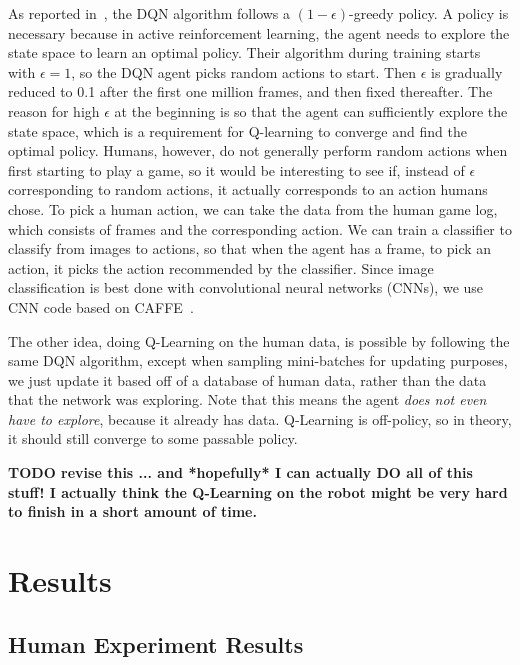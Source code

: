 \documentclass[letterpaper, 10 pt, conference]{ieeeconf}  %
\begin{document}
As reported in~\cite{mnih-dqn-2015}, the DQN algorithm follows a $(1-\epsilon)$-greedy policy. A
policy is necessary because in active reinforcement learning, the agent needs to explore the state
space to learn an optimal policy. Their algorithm during training starts with $\epsilon=1$, so the
DQN agent picks random actions to start. Then $\epsilon$ is gradually reduced to 0.1 after the first
one million frames, and then fixed thereafter. The reason for high $\epsilon$ at the beginning is so
that the agent can sufficiently explore the state space, which is a requirement for Q-learning to
converge and find the optimal policy. Humans, however, do not generally perform random actions when
first starting to play a game, so it would be interesting to see if, instead of $\epsilon$
corresponding to random actions, it actually corresponds to an action humans chose. To pick a human
action, we can take the data from the human game log, which consists of frames and the corresponding
action. We can train a classifier to classify from images to actions, so that when the agent has a
frame, to pick an action, it picks the action recommended by the classifier. Since image
classification is best done with convolutional neural networks (CNNs), we use CNN code based on
CAFFE~\cite{caffe}.

The other idea, doing Q-Learning on the human data, is possible by following the same DQN algorithm,
except when sampling mini-batches for updating purposes, we just update it based off of a database
of human data, rather than the data that the network was exploring. Note that this means the agent
\emph{does not even have to explore}, because it already has data. Q-Learning is off-policy, so in
theory, it should still converge to some passable policy.

\textbf{TODO revise this ... and *hopefully* I can actually DO all of this stuff! I actually think
the Q-Learning on the robot might be very hard to finish in a short amount of time.}


\section{Results}\label{sec:results}

\subsection{Human Experiment Results}\label{ssec:human_results}
\end{document}
